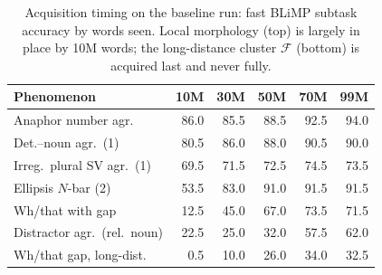\begin{table}[H]
  \centering
  \footnotesize
  \setlength{\tabcolsep}{3pt}
  \begin{tabular}{lrrrrr}
    \toprule
    Phenomenon & 10M & 30M & 50M & 70M & 99M \\
    \midrule
    Anaphor number agr. & 86.0 & 85.5 & 88.5 & 92.5 & 94.0 \\
    Det.--noun agr.\ (1) & 80.5 & 86.0 & 88.0 & 90.5 & 90.0 \\
    Irreg.\ plural SV agr.\ (1) & 69.5 & 71.5 & 72.5 & 74.5 & 73.5 \\
    \midrule
    Ellipsis $N$-bar (2) & 53.5 & 83.0 & 91.0 & 91.5 & 91.5 \\
    Wh/that with gap & 12.5 & 45.0 & 67.0 & 73.5 & 71.5 \\
    Distractor agr.\ (rel.\ noun) & 22.5 & 25.0 & 32.0 & 57.5 & 62.0 \\
    Wh/that gap, long-dist. & 0.5 & 10.0 & 26.0 & 34.0 & 32.5 \\
    \bottomrule
  \end{tabular}
  \caption{Acquisition timing on the baseline run: fast BLiMP subtask
  accuracy by words seen. Local morphology (top) is largely in place by
  10M words; the long-distance cluster $\mathcal{F}$ (bottom) is acquired
  last and never fully.}
  \label{tab:acq}
\end{table}
